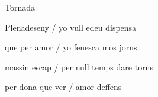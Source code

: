 \documentclass[12pt]{article}
\begin{document}
\begin{estrofaExtra}%




\begin{tornada}

Tornada

\end{tornada}


\end{estrofaExtra}


\begin{estrofa}

 Plenadeseny / yo vull edeu dispensa

 que per amor / yo fenesca mos jorns

 massin escap / per null temps dare torns

 per dona que ver / amor deffens

\end{estrofa}
\end{document}

